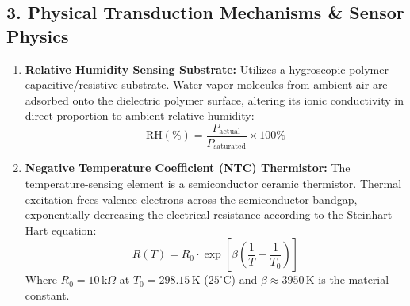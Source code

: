 \documentclass[11pt,a4paper]{article}
\begin{document}
\subsection*{3. Physical Transduction Mechanisms \& Sensor Physics}
\begin{enumerate}[leftmargin=*]
    \item \textbf{Relative Humidity Sensing Substrate:} Utilizes a hygroscopic polymer capacitive/resistive substrate. Water vapor molecules from ambient air are adsorbed onto the dielectric polymer surface, altering its ionic conductivity in direct proportion to ambient relative humidity:
    \begin{equation}
    \text{RH} (\%) = \frac{P_{\text{actual}}}{P_{\text{saturated}}} \times 100\%
    \end{equation}
    \item \textbf{Negative Temperature Coefficient (NTC) Thermistor:} The temperature-sensing element is a semiconductor ceramic thermistor. Thermal excitation frees valence electrons across the semiconductor bandgap, exponentially decreasing the electrical resistance according to the Steinhart-Hart equation:
    \begin{equation}
    R(T) = R_0 \cdot \exp\left[ \beta \left( \frac{1}{T} - \frac{1}{T_0} \right) \right]
    \end{equation}
    Where $R_0 = 10\,\text{k}\Omega$ at $T_0 = 298.15\,\text{K}$ ($25^\circ\text{C}$) and $\beta \approx 3950\,\text{K}$ is the material constant.
\end{enumerate}
\end{document}
